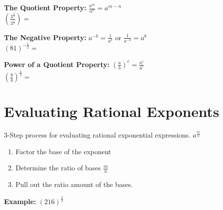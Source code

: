 \documentclass[12pt]{article}
\begin{document}
\vspace{1cm}

\textbf{The Quotient Property:} $\frac{a^m}{a^n}=a^{m-n}$\\

\hspace{1in} $\left(\frac{3^{\frac{3}{2}}}{3^{\frac{1}{2}}}\right)=$\\

\vspace{1cm}

\textbf{The Negative Property:} $a^{-b}=\frac{1}{a^{b}}$ \hspace{1cm} or \hspace{1cm} $\frac{1}{a^{-b}}=a^b$\\

\hspace{1in} $(81)^{-\frac{1}{2}}=$\\

\vspace{1cm}

\textbf{Power of a Quotient Property:} $\left(\frac{a}{b}\right)^c=\frac{a^c}{b^c}$\\

\hspace{1in} $\left(\frac{9}{4}\right)^{\frac{1}{2}}=$\\

\vspace{1cm}


\pagebreak

\section*{Evaluating Rational Exponents}

3-Step process for evaluating rational exponential expressions. $a^{\frac{m}{n}}$

\begin{enumerate}

	\item Factor the base of the exponent 
	
	\item Determine the ratio of bases $\frac{m}{n}$
	
	\item Pull out the ratio amount of the bases. 

\end{enumerate}

\textbf{Example:} $\left(216\right)^{\frac{2}{3}}$\\
\end{document}
